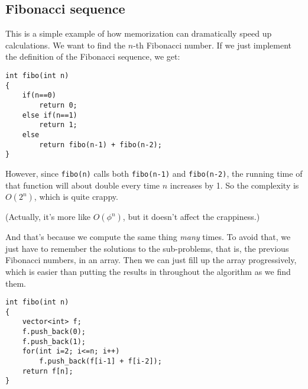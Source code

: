 \subsection{Fibonacci sequence}

This is a simple example of how memorization can dramatically speed up
calculations.
We want to find the $n$-th Fibonacci number.
If we just implement the definition of the Fibonacci sequence, we get:
\begin{verbatim}
int fibo(int n)
{
    if(n==0)
        return 0;
    else if(n==1)
        return 1;
    else
        return fibo(n-1) + fibo(n-2);
}
\end{verbatim}
However, since \texttt{fibo(n)} calls both \texttt{fibo(n-1)} and
\texttt{fibo(n-2)}, the running time of that function will about double
every time $n$ increases by 1.
So the complexity is $O(2^n)$, which is quite crappy.

(Actually, it's more like $O(\phi^n)$, but it doesn't affect the crappiness.)

And that's because we compute the same thing \emph{many} times.
To avoid that, we just have to remember the solutions to the sub-problems,
that is, the previous Fibonacci numbers, in an array.
Then we can just fill up the array progressively, which is easier than
putting the results in throughout the algorithm as we find them.
\begin{verbatim}
int fibo(int n)
{
    vector<int> f;
    f.push_back(0);
    f.push_back(1);
    for(int i=2; i<=n; i++)
        f.push_back(f[i-1] + f[i-2]);
    return f[n];
}
\end{verbatim}
